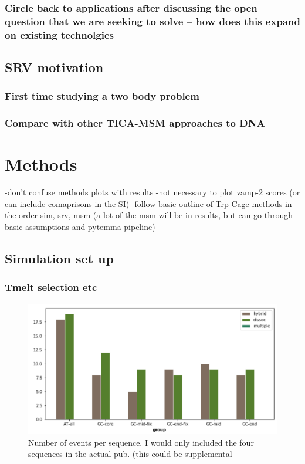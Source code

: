 \documentclass[journal=jpcbfk,manuscript=article]{achemso}
\begin{document}
\subsubsection{\label{sec:intro}Circle back to applications after discussing the open question that we are seeking to solve -- how does this expand on existing technolgies}

\subsection{\label{sec:intro}SRV motivation}
\subsubsection{\label{sec:intro}First time studying a two body problem}
\subsubsection{\label{sec:intro}Compare with other TICA-MSM approaches to DNA}


\section{\label{sec:methods}Methods}

-don't confuse methods plots with results
-not necessary to plot vamp-2 scores (or can include comaprisons in the SI)
-follow basic outline of Trp-Cage methods in the order sim, srv, msm (a lot of the msm will be in results, but can go through basic assumptions and pytemma pipeline)
 
\subsection{\label{sec:methods}Simulation set up}
\subsubsection{\label{sec:methods}Tmelt selection etc}

\begin{figure}[ht!]
	\begin{center}
        \includegraphics[width=\textwidth]{Figs/skeleton/n_events.PNG}
        \caption{Number of events per sequence. I would only included the four sequences in the actual pub. (this could be supplemental}
        \label{fig:n_events}
	\end{center}
\end{figure}   
\end{document}
